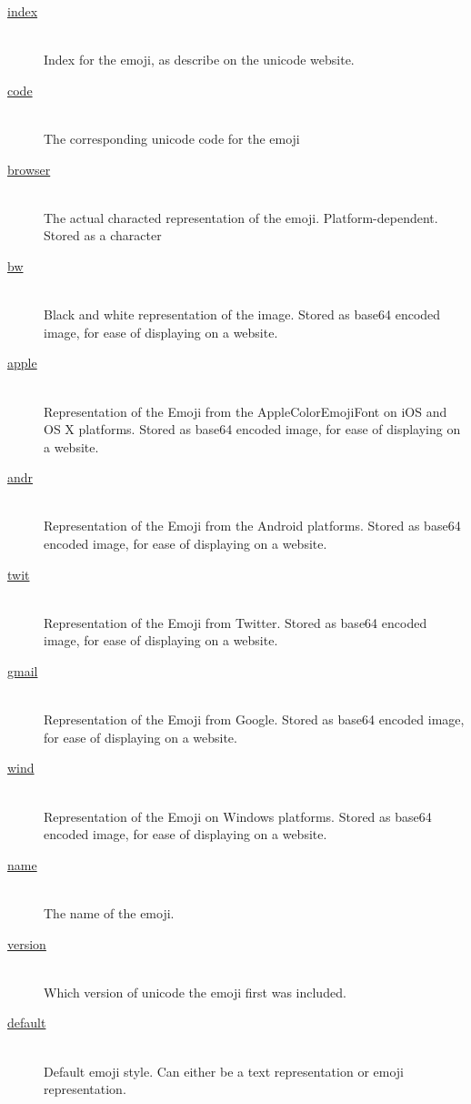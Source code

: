 \documentclass[a4paper]{article}
\begin{document}
\begin{description}

    \item[\url{index}] \hfill \\
        Index for the emoji, as describe on the unicode website.
    \item[\url{code}] \hfill \\
        The corresponding unicode code for the emoji
    \item[\url{browser}] \hfill \\
        The actual characted representation of the emoji. Platform-dependent. Stored as a character
    \item[\url{bw}] \hfill \\
        Black and white representation of the image. Stored as base64 encoded image, for ease of displaying on a website.
    \item[\url{apple}] \hfill \\
        Representation of the Emoji from the AppleColorEmojiFont on iOS and OS X platforms. Stored as base64 encoded image, for ease of displaying on a website.
    \item[\url{andr}] \hfill \\
        Representation of the Emoji from the Android platforms. Stored as base64 encoded image, for ease of displaying on a website.
    \item[\url{twit}] \hfill \\
        Representation of the Emoji from Twitter. Stored as base64 encoded image, for ease of displaying on a website.
    \item[\url{gmail}] \hfill \\
        Representation of the Emoji from Google. Stored as base64 encoded image, for ease of displaying on a website.
    \item[\url{wind}] \hfill \\
        Representation of the Emoji on Windows platforms. Stored as base64 encoded image, for ease of displaying on a website.
    \item[\url{name}] \hfill \\
        The name of the emoji.
    \item[\url{version}] \hfill \\
        Which version of unicode the emoji first was included.
    \item[\url{default}] \hfill \\
        Default emoji style. Can either be a text representation or emoji representation.

\end{description}
\end{document}
